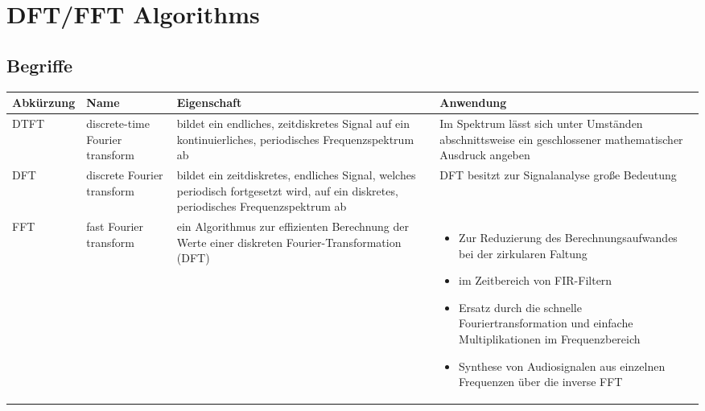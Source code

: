 \section{DFT/FFT Algorithms}
\subsection{Begriffe}

\begin{tabularx}{\textwidth}{l p{3cm}XX}
	Abkürzung & Name  & Eigenschaft & Anwendung \\\hline
	DTFT &
	discrete-time Fourier transform &
	bildet ein endliches, zeitdiskretes Signal auf ein kontinuierliches, periodisches Frequenzspektrum ab &
	Im Spektrum lässt sich unter Umständen  abschnittsweise ein geschlossener mathematischer Ausdruck angeben \\
	DFT &
	discrete Fourier transform &
	bildet ein zeitdiskretes, endliches Signal, welches periodisch fortgesetzt wird, auf ein diskretes, periodisches Frequenzspektrum ab &
	DFT besitzt zur Signalanalyse große Bedeutung \\
	FFT &
	fast Fourier transform &
	ein Algorithmus zur effizienten Berechnung der Werte einer diskreten Fourier-Transformation (DFT) &
	\vspace{-19pt}
	\begin{itemize}
		\item Zur Reduzierung des Berechnungsaufwandes bei der zirkularen Faltung
		\item im Zeitbereich von FIR-Filtern
		\item Ersatz durch die schnelle Fouriertransformation und einfache Multiplikationen im Frequenzbereich
		\item Synthese von Audiosignalen aus einzelnen Frequenzen über die inverse FFT
	\end{itemize}\\
\end{tabularx}

